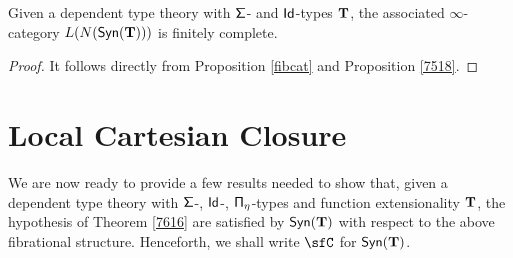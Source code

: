 \begin{cor}\label{fincompl1}
  Given a dependent type theory with $\operatorname{\mathsf{\Sigma}}$- and $\operatorname{\mathsf{Id}}$-types $\operatorname{\mathbf{T}}$, the
  associated $\infty$-category $L(N(\mathsf{Syn}(\mathbf{T})))$ is finitely complete.
\end{cor}
\begin{proof}
  It follows directly from Proposition \ref{fibcat} and Proposition \ref{7518}.
\end{proof}

\section{Local Cartesian Closure}

We are now ready to provide a few results needed to show that, given a dependent
type theory with $\operatorname{\mathsf{\Sigma}}$-, $\operatorname{\mathsf{Id}}$-, $\operatorname{\mathsf{\Pi}_\eta}$-types and function
extensionality $\operatorname{\mathbf{T}}$, the hypothesis of Theorem \ref{7616} are satisfied by
$\mathsf{Syn}(\mathbf{T})$ with respect to the above fibrational structure. Henceforth, we shall
write $\sfC$ for $\mathsf{Syn}(\mathbf{T})$.

